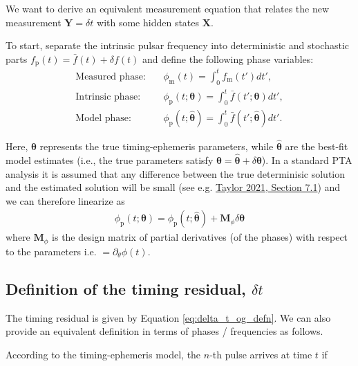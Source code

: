 \documentclass[]{scrartcl}
\begin{document}
\noindent We want to derive an equivalent measurement equation that relates the new measurement $\boldsymbol{Y} = \delta t$ with some hidden states $\boldsymbol{X}$. \newline 


\noindent To start, separate the intrinsic pulsar frequency into deterministic and stochastic parts $f_{\text{p}}(t) = \bar{f}(t) + \delta f(t)$ and define the following phase variables:
\begin{align}
	\text{Measured phase:} \quad & \phi_{\text{m}}(t) = \int_0^t f_{\text{m}}(t') dt', \label{eq:measured_phase}\\
	\text{Intrinsic phase:} \quad & \phi_{\text{p}}(t;\boldsymbol{\theta}) = \int_0^t \bar{f}(t'; \boldsymbol{\theta}) dt', \label{eq:model_phase} \\
	\text{Model phase:} \quad & \phi_{\text{p}}(t;\boldsymbol{\hat{\theta}}) = \int_0^t \bar{f}(t'; \boldsymbol{\hat{\theta}}) dt'.
\end{align}

Here, $\boldsymbol{\theta}$ represents the true timing-ephemeris parameters, while $\boldsymbol{\hat{\theta}}$ are the best-fit model estimates (i.e., the true parameters satisfy $\boldsymbol{\theta} = \boldsymbol{\hat{\theta}} + \delta \boldsymbol{\theta}$). In a standard PTA analysis it is assumed that any difference between the true determinisic solution and the estimated solution will be small (see e.g. \href{https://arxiv.org/abs/2105.13270}{Taylor 2021, Section 7.1}) and we can therefore linearize as
\begin{eqnarray}
\phi_{\text{p}}(t;\boldsymbol{\theta}) = \phi_{\text{p}}(t;\boldsymbol{\hat{\theta}}) + \mathbf{M}_{\phi} \delta \boldsymbol{\theta} \label{eq:MMatrix}
\end{eqnarray}
where $\mathbf{M}_{\phi}$ is the design matrix of partial derivatives (of the phases) with respect to the parameters i.e. $= \partial_{\theta} \phi(t)$. 

\subsection{Definition of the timing residual, $\delta t$}
The timing residual is given by Equation \eqref{eq:delta_t_og_defn}. We can also provide an equivalent definition in terms of phases / frequencies as follows. \newline 

\noindent According to the timing-ephemeris model, the $n$-th pulse arrives at time $t$ if 
\end{document}
